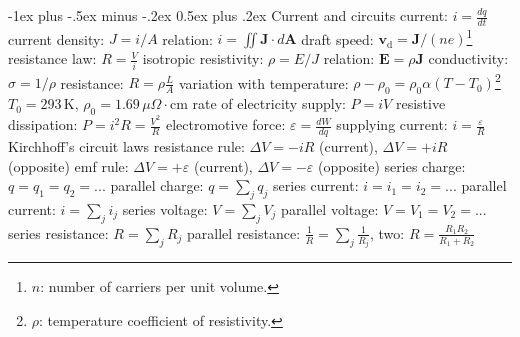 \documentclass[10pt,landscape]{article}
\makeatletter
\renewcommand{\subsection}{\@startsection{subsection}{2}{0mm}%
                                {-1ex plus -.5ex minus -.2ex}%
                                {0.5ex plus .2ex}%
                                {\normalfont\normalsize\bfseries}}
\newcommand{\spc}{\hspace*{1em}}
\makeatother
\begin{document}
\begin{multicols}{3}
\subsection{Current and circuits}
current: $i=\frac{dq}{dt}$
\newline
current density: $J=i/A$
\newline
\spc relation: $i=\iint \mathbf{J}\cdot d\mathbf{A}$
\newline
\spc draft speed: $\mathbf{v}_\mathrm{d}=\mathbf{J}/(ne)$\footnote{ $n$: number of carriers per unit volume.}
\newline
resistance law: $R=\frac{V}{i}$
\newline
isotropic resistivity: $\rho=E/J$
\newline
\spc relation: $\mathbf{E}=\rho \mathbf{J}$
\newline
conductivity: $\sigma =1/\rho $
\newline
resistance: $R=\rho \frac{L}{A}$
\newline
\spc variation with temperature: $\rho -\rho _0=\rho _0\alpha (T-T_0)$\footnote{$\rho$: temperature coefficient of resistivity.}
\newline
\spc \spc$T_0=293\,\textrm{K}$, $\rho_0=1.69\,\mu\Omega\cdot\textrm{cm}$
\newline
rate of electricity supply: $P=iV$
\newline
\spc resistive dissipation: $P=i^2R=\frac{V^2}{R}$
\newline
electromotive force: $\varepsilon =\frac{dW}{dq}$
\newline
\spc supplying current: $i=\frac{\varepsilon }{R}$
\newline \newline
Kirchhoff's circuit laws
\newline
\spc resistance rule: $\Delta V=-iR$ (current), $\Delta V=+iR$ (opposite)
\newline
\spc emf rule: $\Delta V=+\varepsilon $ (current), $\Delta V=-\varepsilon $ (opposite)
\newline \newline
series charge: $q=q_1=q_2=...$
\newline
parallel charge: $q=\sum_j q_j$
\newline
series current: $i=i_1=i_2=...$
\newline
parallel current: $i=\sum_j i_j$
\newline
series voltage: $V=\sum _j V_j$
\newline
parallel voltage: $V=V_1=V_2=...$
\newline
series resistance: $R=\sum _j R_j$
\newline
parallel resistance: $\frac{1}{R}=\sum _j \frac{1}{R_j}$, two: $R=\frac{R_1R_2}{R_1+R_2}$
\newpage


\end{multicols}
\end{document}

